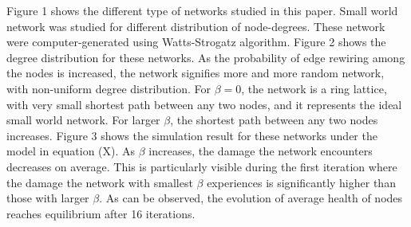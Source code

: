 \documentclass[11pt]{article}
\begin{document}
Figure 1 shows the different type of networks studied in this paper. Small world network was studied for different distribution of node-degrees. These network were computer-generated using Watts-Strogatz algorithm. Figure 2 shows the degree distribution for these networks. As the probability of edge rewiring among the nodes is increased, the network signifies more and more random network, with non-uniform degree distribution. For $\beta=0$, the network is a ring lattice, with very small shortest path between any two nodes, and it represents the ideal small world network. For larger $\beta$, the shortest path between any two nodes increases. Figure 3 shows the simulation result for these networks under the model in equation (X). As $\beta$ increases, the damage the network encounters decreases on average. This is particularly visible during the first iteration where the damage the network with smallest $\beta$ experiences is significantly higher than those with larger $\beta$. As can be observed, the evolution of average health of nodes reaches equilibrium after 16 iterations. 
\end{document}
